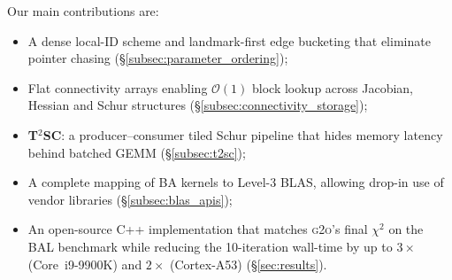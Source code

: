 Our main contributions are:
\begin{itemize}[leftmargin=*]\setlength\itemsep{2pt}
\item A dense local-ID scheme and landmark-first edge bucketing that eliminate pointer chasing (\S\ref{subsec:parameter_ordering});
\item Flat connectivity arrays enabling $\mathcal{O}(1)$ block lookup across Jacobian, Hessian and Schur 
structures (\S\ref{subsec:connectivity_storage});
\item \textbf{T$^{2}$SC}: a producer--consumer tiled Schur pipeline that hides memory latency behind batched 
GEMM (\S\ref{subsec:t2sc});
\item A complete mapping of BA kernels to Level-3 BLAS, allowing drop-in use of vendor libraries (\S\ref{subsec:blas_apis});
\item An open-source C++ implementation that matches \textsc{g2o}'s final $\chi^{2}$ on the BAL benchmark while reducing 
the 10-iteration wall-time by up to $3\times$ (Core~i9-9900K) and $2\times$ (Cortex-A53) (\S\ref{sec:results}).
\end{itemize}



